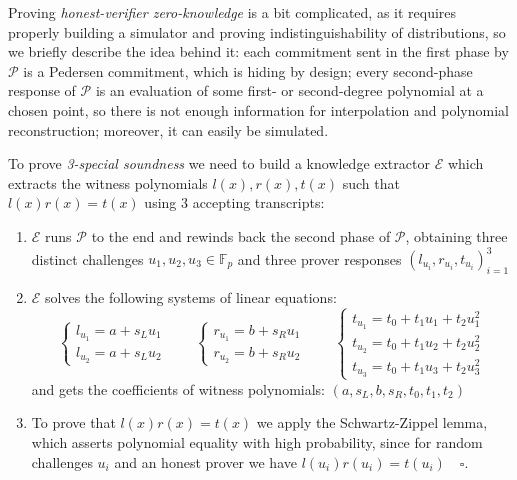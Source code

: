 \documentclass[../lecture-notes-148x210.tex]{subfiles}
\begin{document}
Proving \textit{honest-verifier zero-knowledge} is a bit complicated, as it requires properly building a simulator and proving indistinguishability of distributions, so we briefly describe the idea behind it: each commitment sent in the first phase by $\mathcal{P}$ is a Pedersen commitment, which is hiding by design; every second-phase response of $\mathcal{P}$ is an evaluation of some first- or second-degree polynomial at a chosen point, so there is not enough information for interpolation and polynomial reconstruction; moreover, it can easily be simulated.

To prove \textit{3-special soundness} we need to build a knowledge extractor $\mathcal{E}$ which extracts the witness polynomials $l(x), r(x), t(x)$ such that $l(x)r(x) = t(x)$ using 3 accepting transcripts:
\begin{enumerate}
    \item $\mathcal{E}$ runs $\mathcal{P}$ to the end and rewinds back the second phase of $\mathcal{P}$, obtaining three distinct challenges $u_1, u_2, u_3 \in \mathbb{F}_p$ and three prover responses $(l_{u_i}, r_{u_i}, t_{u_i})_{i=1}^3$
    \item $\mathcal{E}$ solves the following systems of linear equations:
    \begin{equation*}
        \begin{cases}
            l_{u_1} = a + s_L u_1 \\
            l_{u_2} = a + s_L u_2
        \end{cases}
        \qquad
        \begin{cases}
            r_{u_1} = b + s_R u_1 \\
            r_{u_2} = b + s_R u_2
        \end{cases}
        \qquad
        \begin{cases}
            t_{u_1} = t_0 + t_1 u_1 + t_2 u_1^2 \\
            t_{u_2} = t_0 + t_1 u_2 + t_2 u_2^2 \\
            t_{u_3} = t_0 + t_1 u_3 + t_2 u_3^2
        \end{cases}
    \end{equation*}
    and gets the coefficients of witness polynomials: $(a, s_L, b, s_R, t_0, t_1, t_2)$
    \item To prove that $l(x)r(x) = t(x)$ we apply the Schwartz-Zippel lemma, which asserts polynomial equality with high probability, since for random challenges $u_i$ and an honest prover we have $l(u_i)r(u_i) = t(u_i) \quad \square$.
\end{enumerate}
\end{document}

